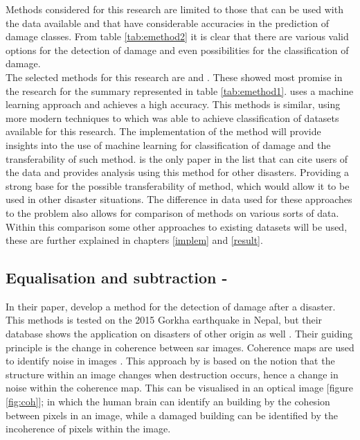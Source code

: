 \noindent Methods considered for this research are limited to those that can be used with the data available and that have considerable accuracies in the prediction of damage classes. From table \ref{tab:emethod2} it is clear that there are various valid options for the detection of damage and even possibilities for the classification of damage. \\

\noindent The selected methods for this research are \citet{Vetrivel2016b} and \citet{Yun2015}. These showed most promise in the research for the summary represented in table \ref{tab:emethod1}. \citet{Vetrivel2016b} uses a machine learning approach and achieves a high accuracy. This methods is similar, using more modern techniques to \cite{Ozisik2004} which was able to achieve classification of datasets available for this research. The implementation of the method will provide insights into the use of machine learning for classification of damage and the transferability of such method. \citet{Yun2015} is the only paper in the list that can cite users of the data and provides analysis using this method for other disasters. Providing a strong base for the possible transferability of method, which would allow it to be used in other disaster situations. The difference in data used for these approaches to the problem also allows for comparison of methods on various sorts of data. Within this comparison some other approaches to existing datasets will be used, these are further explained in chapters \ref{implem} and \ref{result}.

\subsection{Equalisation and subtraction - \citet{Yun2015}} \label{sec:yun}
In their paper, \citet{Yun2015} develop a method for the detection of damage after a disaster. This methods is tested on the 2015 Gorkha earthquake in Nepal, but their database shows the application on disasters of other origin as well \citep{JPL2018}. Their guiding principle is the change in coherence between \ac{sar} images. Coherence maps are used to identify noise in images \citep{Ferretti2007}. This approach by \citet{Yun2015} is based on the notion that the structure within an image changes when destruction occurs, hence a change in noise within the coherence map. This can be visualised in an optical image [figure \ref{fig:coh}]; in which the human brain can identify an building by the cohesion between pixels in an image, while a damaged building can be identified by the incoherence of pixels within the image. 

